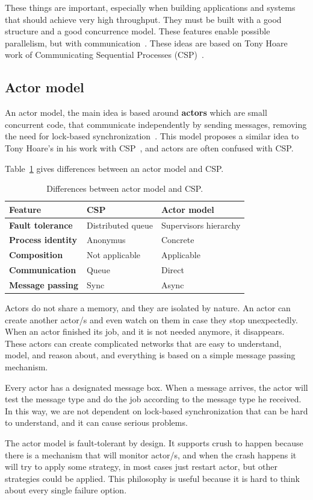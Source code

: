\noindent
These things are important, especially when building applications and systems that should achieve very high throughput. They must be built with a good structure and a good concurrence model. These features enable possible parallelism, but with communication~\cite{Pike}. These ideas are based on Tony Hoare work of Communicating Sequential Processes (CSP)~\cite{Hoare78}.

\subsection{Actor model}\label{sec:actor_model}
%
An actor model, the main idea is based around \textbf{actors} which are small concurrent code, that communicate independently by sending messages, removing the need for lock-based synchronization~\cite{Hewitt}. This model proposes a similar idea to Tony Hoare's in his work with CSP~\cite{Hoare78}, and actors are often confused with CSP. 

Table~\ref{tab:table6} gives differences between an actor model and CSP.

\begin{table}[h!]
	\begin{center}
		\begin{tabular}{l|l|l}
			\textbf{Feature} & \textbf{CSP} & \textbf{Actor model}\\
			\hline
			\textbf{Fault tolerance} & Distributed queue &  Supervisors hierarchy \\
			\textbf{Process identity} & Anonymus & Concrete \\
			\textbf{Composition} & Not applicable & Applicable \\
			\textbf{Communication} & Queue & Direct \\
			\textbf{Message passing} & Sync & Async\\
		\end{tabular}
	\end{center}
	\vspace{-0.5cm}
	\caption{Differences between actor model and CSP.}
	\label{tab:table6}
\end{table}

\noindent
Actors do not share a memory, and they are isolated by nature. An actor can create another actor/s and even watch on them in case they stop unexpectedly. When an actor finished its job, and it is not needed anymore, it disappears. These actors can create complicated networks that are easy to understand, model, and reason about, and everything is based on a simple message passing mechanism. 

Every actor has a designated message box. When a message arrives, the actor will test the message type and do the job according to the message type he received. In this way, we are not dependent on lock-based synchronization that can be hard to understand, and it can cause serious problems.

The actor model is fault-tolerant by design. It supports crush to happen because there is a  mechanism that will monitor actor/s, and when the crash happens it will try to apply some strategy, in most cases just restart actor, but other strategies could be applied. This philosophy is useful because it is hard to think about every single failure option.
%
%